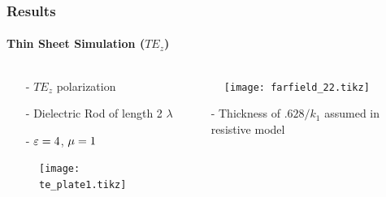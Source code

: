 \documentclass[mathserif,16pt,xcolor=table]{beamer}
\begin{document}
\begin{frame}
  \frametitle{Results}
  \framesubtitle{Thin Sheet Simulation ($TE_z$)}
  \begin{columns}[T] %
    \begin{column}{.5\textwidth}
      \begin{itemize}
        \item[-]{$TE_z$ polarization}
        \item[-]{Dielectric Rod of length 2 $\lambda$}
        \item[-]{$\varepsilon = 4$, $\mu = 1$}
      \end{itemize}
      \begin{figure}
        \centering
        \texttt{[image: te\_plate1.tikz]}
        \label{fig:te_plate}
      \end{figure}
    \end{column}
    \begin{column}[T]{.5\textwidth}
      \begin{figure}
        \vspace*{-1cm}
        \texttt{[image: farfield\_22.tikz]}
        \label{fig:TE_rcs}
      \end{figure}
      \begin{itemize}
        \item[-]{Thickness of $.628/k_1$ assumed in resistive model}
      \end{itemize}
      \end{column}%
    \end{columns}
  \end{frame}
\end{document}
